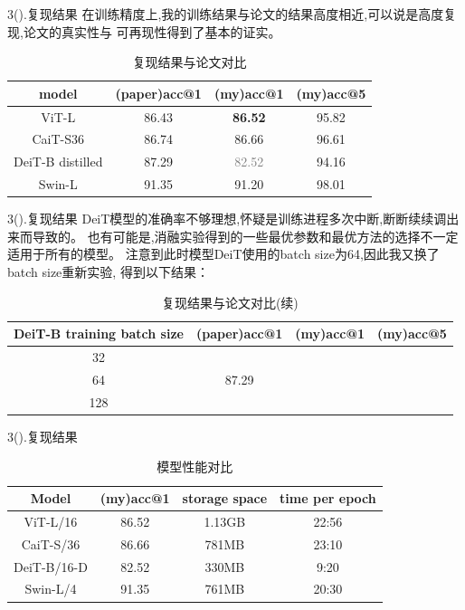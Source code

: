 \documentclass[UTF8]{ctexbeamer}
\begin{document}
\begin{frame}{3(\ast).复现结果}
  在训练精度上,我的训练结果与论文的结果高度相近,可以说是高度复现,论文的真实性与
  可再现性得到了基本的证实。
  \begin{table}[h!]
    \centering
    \begin{tabular}{|c|c|c|c|}
    \hline
    model & (paper)acc@1 & (my)acc@1 & (my)acc@5 \\
    \hline
    ViT-L & 86.43 & \textbf{86.52} & 95.82 \\
    CaiT-S36 & 86.74 & 86.66 & 96.61 \\
    DeiT-B distilled & 87.29 & \textcolor{gray}{82.52} & 94.16 \\
    Swin-L & 91.35 & 91.20 & 98.01 \\
    \hline
    \end{tabular}
    \caption{复现结果与论文对比}
    \end{table}
\end{frame}

\begin{frame}{3(\ast).复现结果}
  DeiT模型的准确率不够理想,怀疑是训练进程多次中断,断断续续调出来而导致的。
  也有可能是,消融实验得到的一些最优参数和最优方法的选择不一定适用于所有的模型。
  注意到此时模型DeiT使用的batch size为64,因此我又换了batch size重新实验,
  得到以下结果：
  \begin{table}[]
    \centering
    \begin{tabular}{|c|c|c|c|}
    \hline
    DeiT-B training batch size & (paper)acc@1 & (my)acc@1 & (my)acc@5 \\ \hline
    32 & & & \\ \hline
    64 & 87.29 & & \\ \hline
    128 & & & \\ \hline
    \end{tabular}
    \caption{复现结果与论文对比(续)}
    \end{table}    
\end{frame}

\begin{frame}{3(\ast).复现结果}
  \begin{table}[h!]
    \centering
    \begin{tabular}{|c|c|c|c|}
    \hline
    Model & (my)acc@1 & storage space & time per epoch \\
    \hline
    ViT-L/16 & 86.52 & 1.13GB & 22:56 \\
    CaiT-S/36 & 86.66 & 781MB & 23:10 \\
    DeiT-B/16-D & 82.52 & 330MB & 9:20 \\
    Swin-L/4 & 91.35 & 761MB & 20:30 \\
    \hline
    \end{tabular}
    \caption{模型性能对比}
  \end{table}
    
\end{frame}
\end{document}
